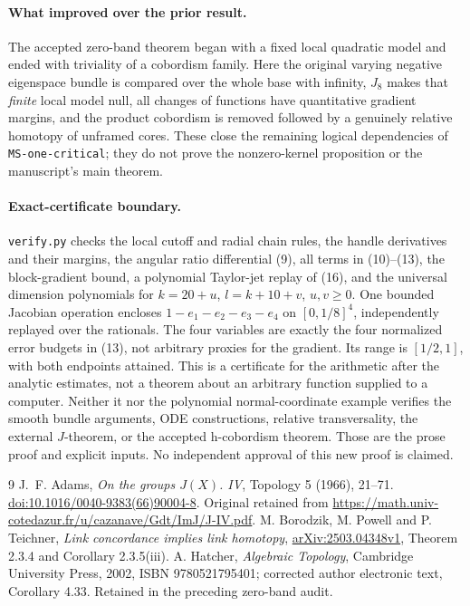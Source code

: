 \documentclass[11pt]{article}
\begin{document}
\paragraph{What improved over the prior result.}
The accepted zero-band theorem began with a fixed local quadratic
model and ended with triviality of a cobordism family.
Here the original varying negative eigenspace bundle is compared
over the whole base with infinity, \(J_8\) makes that \emph{finite}
local model null, all changes of functions have quantitative
gradient margins, and the product cobordism is removed followed by
a genuinely relative homotopy of unframed cores.
These close the remaining logical dependencies of
\texttt{MS-one-critical}; they do not prove the nonzero-kernel
proposition or the manuscript's main theorem.

\paragraph{Exact-certificate boundary.}
\texttt{verify.py} checks the local cutoff and radial chain rules,
the handle derivatives and their margins, the angular ratio
differential (9), all terms in (10)--(13), the block-gradient bound,
a polynomial Taylor-jet replay of (16), and the universal dimension
polynomials for \(k=20+u\), \(l=k+10+v\), \(u,v\geq0\).
One bounded Jacobian operation encloses
\(1-e_1-e_2-e_3-e_4\) on \([0,1/8]^4\), independently replayed
over the rationals. The four variables are exactly the four
normalized error budgets in (13), not arbitrary proxies for the
gradient. Its range is \([1/2,1]\), with both endpoints attained.
This is a certificate for the arithmetic after the analytic
estimates, not a theorem about an arbitrary function supplied to
a computer.
Neither it nor the polynomial normal-coordinate example verifies
the smooth bundle arguments, ODE constructions, relative
transversality, the external \(J\)-theorem, or the accepted
h-cobordism theorem. Those are the prose proof and explicit inputs.
No independent approval of this new proof is claimed.

\begin{thebibliography}{9}
J.~F. Adams, \emph{On the groups \(J(X)\). IV},
Topology 5 (1966), 21--71.
\href{https://doi.org/10.1016/0040-9383(66)90004-8}
{doi:10.1016/0040-9383(66)90004-8}.
Original retained from
\url{https://math.univ-cotedazur.fr/u/cazanave/Gdt/ImJ/J-IV.pdf}.
M. Borodzik, M. Powell and P. Teichner,
\emph{Link concordance implies link homotopy},
\href{https://arxiv.org/abs/2503.04348v1}{arXiv:2503.04348v1},
Theorem 2.3.4 and Corollary 2.3.5(iii).
A. Hatcher, \emph{Algebraic Topology}, Cambridge University Press,
2002, ISBN 9780521795401; corrected author electronic text,
Corollary 4.33. Retained in the preceding zero-band audit.
\end{thebibliography}
\end{document}
